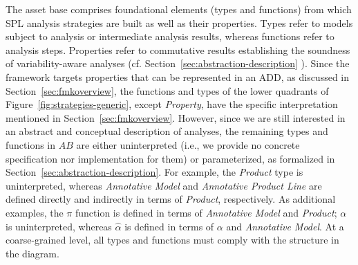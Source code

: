 The asset base comprises foundational elements (types and functions) from which SPL analysis strategies are built as well as their properties. Types refer to models subject to analysis or intermediate analysis results, whereas functions refer to analysis steps. Properties refer to commutative results establishing the soundness of variability-aware 
analyses (cf. Section~\ref{sec:abstraction-description} ). Since the framework targets properties that can be represented in an ADD, as discussed in Section~\ref{sec:fmkoverview}, the functions and types of the lower quadrants of Figure~\ref{fig:strategies-generic}, except \textit{Property}, have the specific interpretation mentioned in Section~\ref{sec:fmkoverview}. However, since we are still interested in an abstract and conceptual description of analyses, the remaining types and functions in $AB$ are either uninterpreted (i.e., we provide no concrete specification nor implementation for them)  or  parameterized, as formalized in Section~\ref{sec:abstraction-description}. For example, the \textit{Product} type is uninterpreted, whereas \textit{Annotative Model} and \textit{Annotative Product Line} are defined directly and indirectly in terms of \textit{Product}, respectively. As additional examples, the $\pi$ function is defined in terms of \textit{Annotative Model} and \textit{Product}; $\alpha$ is uninterpreted, whereas $\hat{\alpha}$ is defined in terms of $\alpha$ and \textit{Annotative Model}.
At a coarse-grained level, all types and functions  must comply with the structure in the diagram. 

